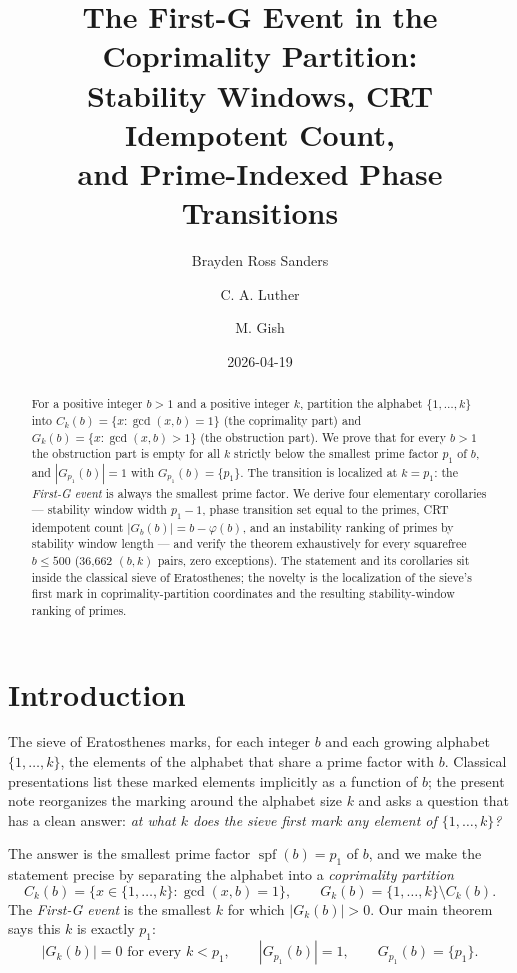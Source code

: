 \documentclass[11pt,reqno]{amsart}
\title[The First-G Event in the Coprimality Partition]
  {The First-G Event in the Coprimality Partition:\\
   Stability Windows, CRT Idempotent Count,\\
   and Prime-Indexed Phase Transitions}
\author{Brayden Ross Sanders}
\author{C. A. Luther}
\author{M. Gish}
\date{2026-04-19}
\theoremstyle{definition}
\DeclareMathOperator{\spf}{spf}
\begin{document}
\begin{abstract}
For a positive integer $b>1$ and a positive integer $k$, partition the alphabet
$\{1,\ldots,k\}$ into $C_k(b) = \{x : \gcd(x,b)=1\}$ (the coprimality part) and
$G_k(b) = \{x : \gcd(x,b)>1\}$ (the obstruction part). We prove that for every
$b>1$ the obstruction part is empty for all $k$ strictly below the smallest
prime factor $p_1$ of $b$, and $|G_{p_1}(b)| = 1$ with
$G_{p_1}(b) = \{p_1\}$. The transition is localized at $k = p_1$: the
\emph{First-G event} is always the smallest prime factor. We derive four
elementary corollaries --- stability window width $p_1 - 1$, phase transition
set equal to the primes, CRT idempotent count
$|G_b(b)| = b - \varphi(b)$, and an instability ranking of primes by stability
window length --- and verify the theorem exhaustively for every squarefree
$b \le 500$ (36{,}662 $(b,k)$ pairs, zero exceptions). The statement and its
corollaries sit inside the classical sieve of Eratosthenes; the novelty is
the localization of the sieve's first mark in coprimality-partition
coordinates and the resulting stability-window ranking of primes.
\end{abstract}

\maketitle

\section{Introduction}
\label{sec:intro}

The sieve of Eratosthenes marks, for each integer $b$ and each growing alphabet
$\{1,\ldots,k\}$, the elements of the alphabet that share a prime factor with
$b$. Classical presentations list these marked elements implicitly as a
function of $b$; the present note reorganizes the marking around the alphabet
size $k$ and asks a question that has a clean answer: \emph{at what $k$ does
the sieve first mark any element of $\{1,\ldots,k\}$?}

The answer is the smallest prime factor $\spf(b) = p_1$ of $b$, and we make
the statement precise by separating the alphabet into a \emph{coprimality
partition}
\[
  C_k(b) = \{x \in \{1,\ldots,k\} : \gcd(x,b) = 1\},
  \qquad
  G_k(b) = \{1,\ldots,k\} \setminus C_k(b).
\]
The \emph{First-G event} is the smallest $k$ for which $|G_k(b)| > 0$. Our
main theorem says this $k$ is exactly $p_1$:
\[
  |G_k(b)| = 0 \text{ for every } k < p_1,
  \qquad
  |G_{p_1}(b)| = 1,
  \qquad
  G_{p_1}(b) = \{p_1\}.
\]
\end{document}
